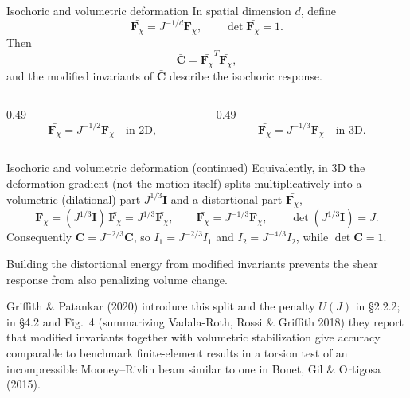 \documentclass[aspectratio=169,11pt]{beamer}
\newcommand{\I}{\bm{I}}
\newcommand{\Fdef}{\bm{F}_{\chi}}
\newcommand{\Cten}{\bm{C}}
\begin{document}
\begin{frame}{Isochoric and volumetric deformation}
In spatial dimension \(d\), define
\[
  \boxed{
  \bar{\Fdef}=J^{-1/d}\Fdef
  },
\qquad
  \det\bar{\Fdef}=1.
\]
Then
\[
  \bar{\Cten}
  =
  \bar{\Fdef}^T\bar{\Fdef},
\]
and the modified invariants of \(\bar{\Cten}\) describe the isochoric response.
\begin{columns}[T,onlytextwidth]
\begin{column}{0.49\textwidth}
\[
  \bar{\Fdef}=J^{-1/2}\Fdef
  \quad\text{in 2D},
\]
\end{column}
\begin{column}{0.49\textwidth}
\[
  \bar{\Fdef}=J^{-1/3}\Fdef
  \quad\text{in 3D}.
\]
\end{column}
\end{columns}

\end{frame}

\begin{frame}{Isochoric and volumetric deformation (continued)}
Equivalently, in 3D the deformation gradient (not the motion itself) splits multiplicatively into a volumetric (dilational) part \(J^{1/3}\I\) and a distortional part \(\bar{\Fdef}\),
\[
  \Fdef=(J^{1/3}\I)\,\bar{\Fdef}=J^{1/3}\bar{\Fdef},
  \qquad
  \bar{\Fdef}=J^{-1/3}\Fdef ,
  \qquad
  \det(J^{1/3}\I)=J .
\]
Consequently \(\bar{\Cten}=J^{-2/3}\Cten\), so \(\bar I_1=J^{-2/3}I_1\) and \(\bar I_2=J^{-4/3}I_2\), while \(\det\bar{\Cten}=1\).
\begin{punchbox}
\small
Building the distortional energy from modified invariants prevents the shear response from also penalizing volume change.

\smallskip
{\scriptsize Griffith \& Patankar (2020) introduce this split and the penalty \(U(J)\) in \S2.2.2; in \S4.2 and Fig.~4 (summarizing Vadala-Roth, Rossi \& Griffith 2018) they report that modified invariants together with volumetric stabilization give accuracy comparable to benchmark finite-element results in a torsion test of an incompressible Mooney--Rivlin beam similar to one in Bonet, Gil \& Ortigosa (2015).}
\end{punchbox}
\end{frame}
\end{document}
